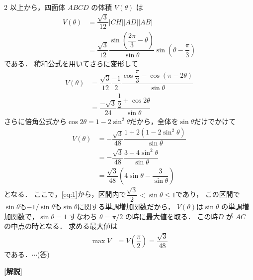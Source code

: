 \documentclass[../../main.tex]{subfiles}
\begin{document}
\begin{multicols}{2}
  以上から，四面体 $ABCD$ の体積 $V(\theta)$ は
  \begin{align}
    V(\theta)
    & = \dfrac{\sqrt{3}}{12}|CH||AD||AB|                                                      \\
    & = \dfrac{\sqrt{3}}{12} \dfrac{\sin\left(\dfrac{2\pi}{3}-\theta\right)}{\sin\theta} \sin(\theta - \dfrac{\pi}{3})
  \end{align}
  である．
  積和公式を用いてさらに変形して
  \begin{align}
    V(\theta)
    & = \dfrac{\sqrt{3}}{12} \dfrac{-1}{2}\dfrac{\cos\dfrac{\pi}{3}-\cos(\pi-2\theta)}{\sin\theta} \\
    & = \dfrac{-\sqrt{3}}{24} \dfrac{\dfrac{1}{2}+\cos 2\theta}{\sin\theta}
  \end{align}
  さらに倍角公式から$\cos 2\theta = 1-2\sin^2\theta$だから，全体を$\sin\theta$だけでかけて
  \begin{align}
    V(\theta)
    & = -\dfrac{\sqrt{3}}{48} \dfrac{1+2(1-2\sin^2\theta)}{\sin\theta}        \\
    & = -\dfrac{\sqrt{3}}{48} \dfrac{3-4\sin^2\theta}{\sin\theta}             \\
    & = \dfrac{\sqrt{3}}{48} \left(4\sin\theta - \dfrac{3}{\sin\theta}\right)
  \end{align}
  となる．
  ここで，\cref{eq:1}から，区間内で$\dfrac{\sqrt{3}}{2}<\sin\theta\le 1$であり，
  この区間で$\sin\theta$も$-1/\sin\theta$も$\sin\theta$に関する単調増加関数だから，
  $V(\theta)$は$\sin\theta$ の単調増加関数で，$\sin\theta=1$ すなわち $\theta=\pi/2$
  の時に最大値を取る．
  この時$D$ が $AC$ の中点の時となる．
  求める最大値は
  \begin{align}
    \max V
    & = V\left(\dfrac{\pi}{2}\right)
    = \dfrac{\sqrt{3}}{48}
  \end{align}
  である．$\cdots$(答)

  {\bf [解説]}

  \newpage
\end{multicols}
\end{document}
